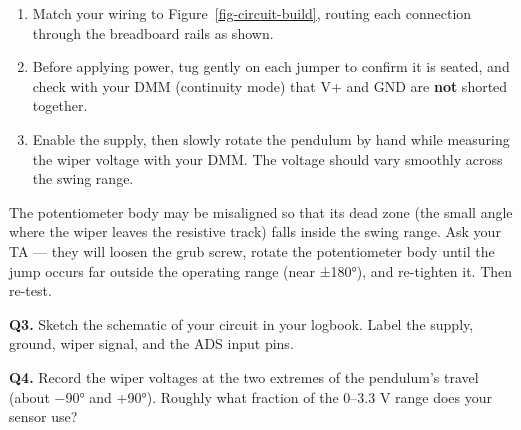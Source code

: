 \documentclass[
  12pt,
  letterpaper,
]{article}
\providecommand{\tightlist}{%
  \setlength{\itemsep}{0pt}\setlength{\parskip}{0pt}}
\begin{document}
\begin{enumerate}
\def\labelenumi{\arabic{enumi}.}
\tightlist
\item
  Match your wiring to Figure~\ref{fig-circuit-build}, routing each
  connection through the breadboard rails as shown.
\item
  Before applying power, tug gently on each jumper to confirm it is
  seated, and check with your DMM (continuity mode) that V+ and GND are
  \textbf{not} shorted together.
\item
  Enable the supply, then slowly rotate the pendulum by hand while
  measuring the wiper voltage with your DMM. The voltage should vary
  smoothly across the swing range.
\end{enumerate}

\begin{tcolorbox}[enhanced jigsaw, arc=.35mm, bottomrule=.15mm, bottomtitle=1mm, breakable, colback=white, colbacktitle=quarto-callout-note-color!10!white, colframe=quarto-callout-note-color-frame, coltitle=black, left=2mm, leftrule=.75mm, opacityback=0, opacitybacktitle=0.6, rightrule=.15mm, title=\textcolor{quarto-callout-note-color}{\faInfo}\hspace{0.5em}{If the voltage jumps or drops suddenly}, titlerule=0mm, toprule=.15mm, toptitle=1mm]

The potentiometer body may be misaligned so that its dead zone (the
small angle where the wiper leaves the resistive track) falls inside the
swing range. Ask your TA --- they will loosen the grub screw, rotate the
potentiometer body until the jump occurs far outside the operating range
(near ±180°), and re-tighten it. Then re-test.

\end{tcolorbox}

\begin{tcolorbox}[enhanced jigsaw, arc=.35mm, bottomrule=.15mm, bottomtitle=1mm, breakable, colback=white, colbacktitle=quarto-callout-important-color!10!white, colframe=quarto-callout-important-color-frame, coltitle=black, left=2mm, leftrule=.75mm, opacityback=0, opacitybacktitle=0.6, rightrule=.15mm, title=\textcolor{quarto-callout-important-color}{\faExclamation}\hspace{0.5em}{Logbook Questions}, titlerule=0mm, toprule=.15mm, toptitle=1mm]

\textbf{Q3.} Sketch the schematic of your circuit in your logbook. Label
the supply, ground, wiper signal, and the ADS input pins.

\textbf{Q4.} Record the wiper voltages at the two extremes of the
pendulum's travel (about −90° and +90°). Roughly what fraction of the
0--3.3 V range does your sensor use?

\end{tcolorbox}
\end{document}
